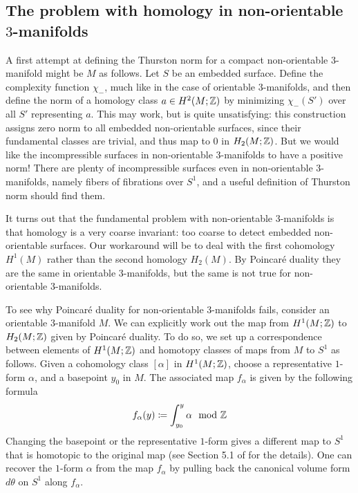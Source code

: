 \subsection{The problem with homology in non-orientable $3$-manifolds}
\label{sec:probl-with-homol}

A first attempt at defining the Thurston norm for a compact non-orientable $3$-manifold might be $M$ as follows.
Let $S$ be an embedded surface.  Define the complexity function $\chi_-$,
much like in the case of orientable $3$-manifolds, and then define the norm of a homology class
$a \in H^2(M; \mathbb{Z})$ by minimizing $\chi_-(S')$ over all $S'$ representing $a$. This may work, but is quite
unsatisfying: this construction assigns zero norm to all embedded non-orientable surfaces, since their
fundamental classes are trivial, and thus map to $0$ in $H_2(M; \mathbb{Z})$. But we would like the
incompressible surfaces in non-orientable $3$-manifolds to have a positive norm! There are plenty of
incompressible surfaces even in non-orientable $3$-manifolds, namely fibers of fibrations over $S^1$, and a useful definition of Thurston norm should find them.

It turns out that the fundamental problem with non-orientable $3$-manifolds is that homology is a
very coarse invariant: too coarse to detect embedded non-orientable surfaces. Our workaround will
be to deal with the first cohomology $H^1(M)$ rather than the second homology $H_2(M)$. By Poincar\'e duality they are the same in orientable 3-manifolds, but the same is not true for non-orientable $3$-manifolds.

To see why Poincar\'e duality for non-orientable 3-manifolds fails, consider an orientable $3$-manifold $M$. We can explicitly work out the map from
$H^1(M; \mathbb{Z})$ to $H_2(M; \mathbb{Z})$ given by Poincar\'e duality.
To do so, we set up a correspondence between elements of $H^1(M; \mathbb{Z})$ and homotopy classes of maps from
$M$ to $S^1$ as follows. Given a cohomology class $[\alpha]$ in $H^1(M; \mathbb{Z})$, choose a representative $1$-form $\alpha$,
and a basepoint $y_0$ in $M$. The associated map $f_{\alpha}$ is given by the following formula
\begin{align}\label{form:map}
  f_{\alpha}(y) \coloneqq  \int_{y_0}^y \alpha \mod {\mathbb{Z}}
\end{align}
Changing the basepoint or the representative $1$-form gives a different map to $S^1$ that is homotopic to the
original map (see Section 5.1 of \cite{calegari2007foliations} for the details). One can recover the $1$-form
$\alpha$ from the map $f_{\alpha}$ by pulling back the canonical volume form $d\theta$ on $S^1$ along $f_{\alpha}$.

